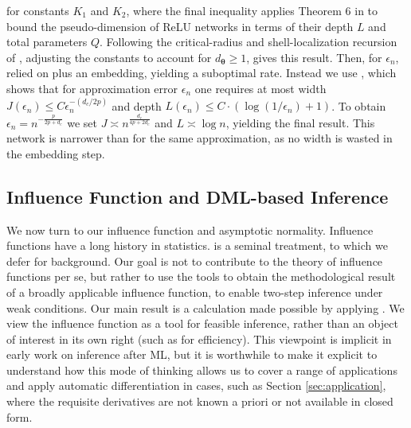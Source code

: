 \documentclass[12pt]{article}
\numberwithin{equation}{section}
\theoremstyle{definition}
\newcommand{\btheta}{\boldsymbol{\theta}}
\newcommand{\dc}{d_c}  %
\newcommand{\dtheta}{d_{\btheta}}  %
\begin{document}
for constants $K_1$ and $K_2$, where the final inequality applies Theorem 6 in \cite{Bartlett-etal2017_COLT} to bound the pseudo-dimension of ReLU networks in terms of their depth $L$ and total parameters $Q$. Following the critical-radius and shell-localization recursion of \cite{Farrell-Liang-Misra2021_Ecma}, adjusting the constants to account for $\dtheta \geq 1$, gives this result. Then, for $\epsilon_n$, \cite{Farrell-Liang-Misra2021_Ecma} relied on \cite{Yarotsky2017_NN} plus an embedding, yielding a suboptimal rate. Instead we use \cite{Tang2025_WP}, which shows that for approximation error $\epsilon_n$ one requires at most width $J(\epsilon_n)  \leq C \epsilon_n^{-(\dc/2p)} $ and depth $L(\epsilon_n) \leq C \cdot ( \log (1/\epsilon_n) + 1)$. To obtain $\epsilon_n = n^{-\frac{p}{2 p+\dc}}$ we set $J \asymp  n^{\frac{\dc}{4p + 2\dc}} $ and $L \asymp \log n$, yielding the final result. This network is narrower than \cite{Farrell-Liang-Misra2021_Ecma} for the same approximation, as no width is wasted in the embedding step. \hfill \qedsymbol






\subsection{Influence Function and DML-based Inference}
	\label{sec:if theory}


We now turn to our influence function and asymptotic normality. Influence functions have a long history in statistics. \cite{Newey1994_Ecma} is a seminal treatment, to which we defer for background. Our goal is not to contribute to the theory of influence functions per se, but rather to use the tools to obtain the methodological result of a broadly applicable influence function, to enable two-step inference under weak conditions. Our main result is a calculation made possible by applying \cite{Newey1994_Ecma}. We view the influence function as a tool for feasible inference, rather than an object of interest in its own right (such as for efficiency). This viewpoint is implicit in early work on inference after ML, but it is worthwhile to make it explicit to understand how this mode of thinking allows us to cover a range of applications and apply automatic differentiation in cases, such as Section \ref{sec:application}, where the requisite derivatives are not known a priori or not available in closed form. 
\end{document}
